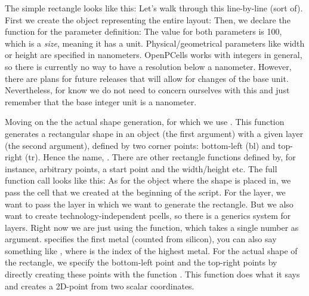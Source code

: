The simple rectangle looks like this:
Let's walk through this line-by-line (sort of).
First we create the object representing the entire layout:
Then, we declare the function for the parameter definition:
The value for both parameters is 100, which is a \emph{size}, meaning it has a unit.
Physical/geometrical parameters like width or height are specified in nanometers.
OpenPCells works with integers in general, so there is currently no way to have a resolution below a nanometer.
However, there are plans for future releases that will allow for changes of the base unit.
Nevertheless, for know we do not need to concern ourselves with this and just remember that the base integer unit is a nanometer.

Moving on the the actual shape generation, for which we use .
This function generates a rectangular shape in an object (the first argument) with a given layer (the second argument), defined by two corner points: bottom-left (bl) and top-right (tr).
Hence the name, .
There are other rectangle functions defined by, for instance, arbitrary points, a start point and the width/height etc.
The full function call looks like this:
As for the object where the shape is placed in, we pass the cell that we created at the beginning of the script.
For the layer, we want to pass the layer in which we want to generate the rectangle.
But we also want to create technology-independent pcells, so there is a generics system for layers.
Right now we are just using the  function, which takes a single number as argument.
 specifies the first metal (counted from silicon), you can also say something like , where  is the index of the highest metal.
For the actual shape of the rectangle, we specify the bottom-left point and the top-right points by directly creating these points with the function .
This function does what it says and creates a 2D-point from two scalar coordinates.

